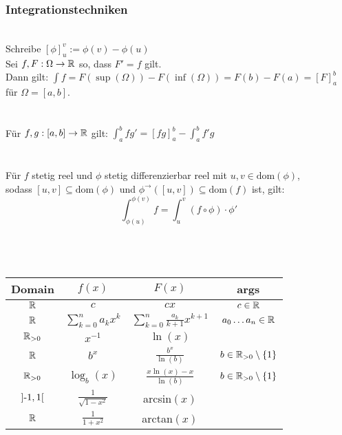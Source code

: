 \subsubsection*{Integrationstechniken}
 \\
Schreibe \([\phi]_u^v := \phi(v) - \phi(u)\) \\
Sei \(f,F: \Omega \rightarrow \mathbb R\) so, dass \(F' = f\) gilt. \\
Dann gilt: \(\int f = F(\sup(\Omega)) - F(\inf(\Omega)) = F(b) - F(a) = [F]_a^b\) für \(\Omega = [a,b]\). \\ \\
 \\
Für \(f,g : [a,b] \rightarrow \mathbb R\) gilt: \(\int_{a}^{b}fg' = [fg]_a^b - \int_{a}^{b}f'g\) \\ \\
 \\
Für \(f\) stetig reel und \(\phi\) stetig differenzierbar reel mit \(u,v \in \text{dom}(\phi)\),\\
sodass \([u,v] \subseteq \text{dom}(\phi)\) und \(\phi^\rightarrow([u,v]) \subseteq \text{dom}(f)\) ist, gilt:
\[\int_{\phi(u)}^{\phi(v)}f = \int_{u}^{v}(f \circ \phi) \cdot \phi'\] \pagebreak \\
 \\ \\
\begin{tabular}{ c | c | c | c }
    \hline
    Domain & \(f(x)\) & \(F(x)\) & args \\
    \hline
    \(\mathbb R\) & \(c\) & \(cx\) & \(c \in \mathbb R\) \\
    \(\mathbb R\) & \(\sum_{k=0}^{n}a_kx^k\) & \(\sum_{k=0}^{n}\frac{a_k}{k+1}x^{k+1}\) & \(a_0 \dots a_n \in \mathbb R\) \\
    \(\mathbb R_{> 0}\) & \(x^{-1}\) & \(\ln(x)\) & \\
    \(\mathbb R\) & \(b^x\) & \(\frac{b^x}{\ln(b)}\) & \(b \in \mathbb R_{>0} \setminus \{1\}\) \\
    \(\mathbb R_{> 0}\) & \(\log_b(x)\) & \(\frac{x\ln(x) - x}{\ln(b)}\) & \(b \in \mathbb R_{>0} \setminus \{1\}\) \\
    \(]\text{-} 1, 1[\) & \(\frac{1}{\sqrt{1-x^2}}\) & arcsin\((x)\) & \\
    \(\mathbb R\) & \(\frac{1}{1+x^2}\) & arctan\((x)\) & \\
\end{tabular}
